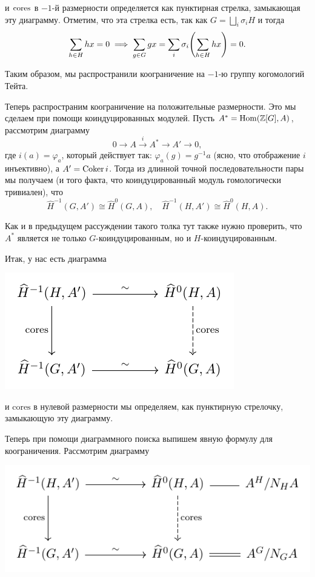 	 и $\operatorname{cores}$ в $-1$-й размерности определяется как пунктирная стрелка, замыкающая эту диаграмму. Отметим, что эта стрелка есть, так как $G = \bigsqcup_{i} \sigma_i H$ и тогда
	 \[
	 	\sum_{h \in H} hx = 0 \implies \sum_{g \in G} gx = \sum_{i} \sigma_i \lr*{\sum_{h \in H} h x} = 0.
	 \]

	 Таким образом, мы распространили коограничение на $-1$-ю группу когомологий Тейта. 

	 Теперь распространим коограничение на положительные размерности. Это мы сделаем при помощи коиндуцированных модулей. Пусть $A^* = \operatorname{Hom}(\mathbb{Z}[G], A)$, рассмотрим диаграмму 
	 \[
	 	0 \to A \xrightarrow{i} A^* \to A' \to 0,
	 \]
	 где $i(a) = \varphi_{a}$, который действует так: $\varphi_a(g) = g^{-1}a$ (ясно, что отображение $i$ инъективно), а  $A' = \operatorname{Coker}{i}$. Тогда из длинной точной последовательности пары мы получаем (и того факта, что коиндуцированный модуль гомологически тривиален), что 
	\[
		\widehat{H}^{-1}(G, A') \cong \widehat{H}^0(G, A), \quad \widehat{H}^{-1}(H, A') \cong \widehat{H}^0(H, A). 	
	 \]

	 \begin{remark}
	 	Как и в предыдущем рассуждении такого толка тут также нужно проверить, что $A^*$ является не только $G$-коиндуцированным, но и $H$-коиндуцированным. 
	 \end{remark}

	 Итак, у нас есть диаграмма 

	 \begin{center}
	 	\includegraphics{lectures/6/pictures/cd_15.pdf}
	 \end{center} 

	 и $\mathrm{cores}$ в нулевой размерности мы определяем, как пунктирную стрелочку, замыкающую эту диаграмму. 


	 Теперь при помощи диаграммного поиска выпишем явную формулу для коограничения. Рассмотрим диаграмму 
	 \begin{center}
	 	\includegraphics{lectures/6/pictures/cd_16.pdf}
	 \end{center}

